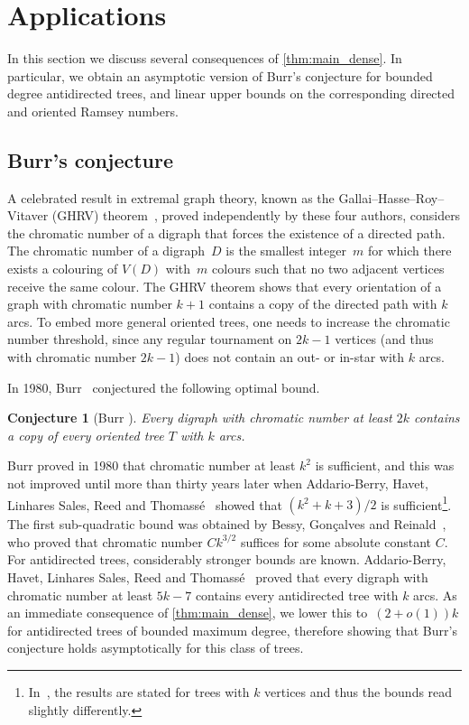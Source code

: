 \documentclass[11pt]{article}
\newtheorem{conjecture}[theorem]{Conjecture}
\numberwithin{equation}{section}
\theoremstyle{definition}
\begin{document}
\section{Applications}\label{sec:applications}

In this section we discuss several consequences of \cref{thm:main_dense}. In particular, we obtain an asymptotic version of Burr's conjecture for bounded degree antidirected trees, and linear upper bounds on the corresponding directed and oriented Ramsey numbers.

\subsection{Burr's conjecture}

A celebrated result in extremal graph theory, known as the Gallai–Hasse–Roy–Vitaver (GHRV) theorem~\cite{gallai1968directed,hasse1965algebraischen,roy1967nombre,vitaver1962determination}, proved independently by these four authors, considers the chromatic number of a digraph that forces the existence of a directed path. The chromatic number of a digraph~$D$ is the smallest integer~$m$ for which there exists a colouring of $V(D)$ with~$m$ colours such that no two adjacent vertices receive the same colour. The GHRV theorem shows that every orientation of a graph with chromatic number $k+1$ contains a copy of the directed path with $k$ arcs. To embed more general oriented trees, one needs to increase the chromatic number threshold, since any regular tournament on $2k-1$ vertices (and thus with chromatic number $2k-1$) does not contain
an out- or in-star with $k$ arcs. 

In 1980, Burr~\cite{burr1980subtrees} conjectured the following optimal bound.
\begin{conjecture}[Burr \cite{burr1980subtrees}]\label{conj:Burr}
    Every digraph with chromatic number at least $2k$ contains a copy of every oriented tree $T$ with $k$ arcs.
\end{conjecture}

Burr proved in 1980 that chromatic number at least $k^2$ is sufficient, and this was not improved until more than thirty years later when Addario-Berry, Havet, Linhares Sales, Reed and Thomassé~\cite{Addarioberry2013oriented} showed that $(k^2+k+3)/2$ is sufficient\footnote{In~\cite{Addarioberry2013oriented}, the results are stated for trees with $k$ vertices and thus the bounds read slightly differently.}. The first sub-quadratic bound was obtained by Bessy, Gonçalves and Reinald~\cite{bessy2024oriented}, who proved that chromatic number $Ck^{3/2}$ suffices for some absolute constant $C$.
For antidirected trees, considerably stronger bounds are known. Addario-Berry, Havet, Linhares Sales, Reed and Thomassé~\cite{Addarioberry2013oriented} proved that every digraph with chromatic number at least $5k-7$ contains every antidirected tree with $k$ arcs. As an immediate consequence of \cref{thm:main_dense}, we lower this to~${(2+o(1))k}$ for antidirected trees of bounded maximum degree, therefore showing that Burr's conjecture holds asymptotically for this class of trees.
\end{document}

